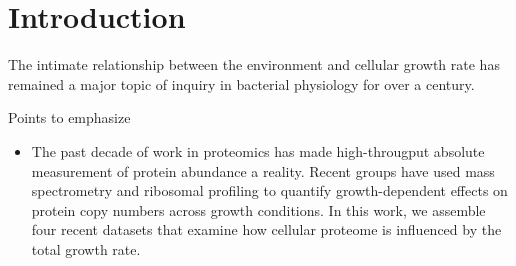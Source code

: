 \section{Introduction}

The intimate relationship between the environment and cellular growth rate
has remained a major topic of inquiry in bacterial physiology for over a
century. 

\begin{figure}
\end{figure}



Points to emphasize
\begin{itemize}
\item The past decade of work in proteomics has made high-througput absolute
measurement of protein abundance a reality. Recent groups have used mass
spectrometry and ribosomal profiling to quantify growth-dependent effects on
protein copy numbers across growth conditions. In this work, we assemble four
recent datasets that examine how cellular proteome is influenced by the total
growth rate. 
\end{itemize}